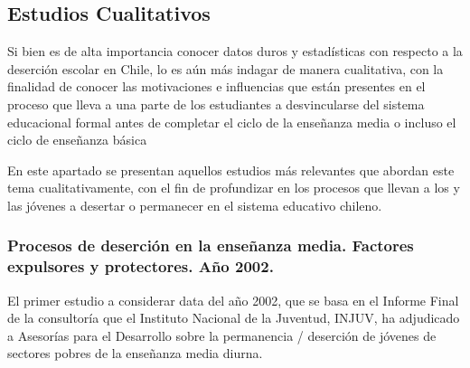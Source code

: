 \subsection{Estudios Cualitativos}

Si bien es de alta importancia conocer datos duros y estadísticas con respecto a la deserción escolar en Chile, lo es aún más indagar de manera cualitativa, con la finalidad de conocer las motivaciones e influencias que están presentes en el proceso que lleva a una parte de los estudiantes a desvincularse del sistema educacional formal antes de completar el ciclo de la enseñanza media o incluso el ciclo de enseñanza básica

En este apartado se presentan aquellos estudios más relevantes que abordan este tema cualitativamente, con el fin de profundizar en los procesos que llevan a los y las jóvenes a desertar o permanecer en el sistema educativo chileno. 

\subsubsection{Procesos de deserción en la enseñanza media. Factores expulsores y protectores. Año 2002.}
El primer estudio a considerar data del año 2002, que se basa en el Informe Final de la consultoría que el Instituto Nacional de la Juventud, INJUV, ha adjudicado a Asesorías para el Desarrollo sobre la permanencia / deserción de jóvenes de sectores pobres de la enseñanza media diurna.

